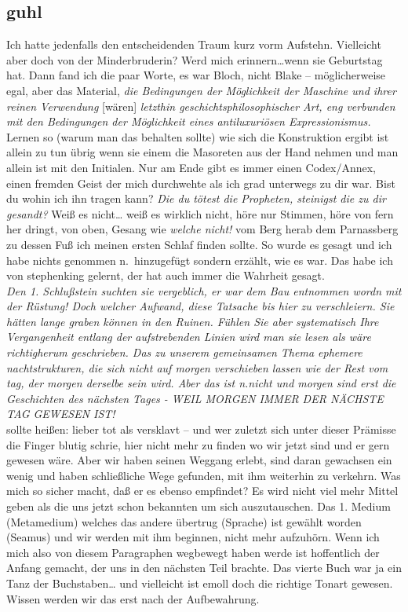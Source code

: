 \documentclass[
]{article}
\author{}
\date{\vspace{-2.5em}}
\begin{document}
\subsection{guhl}\label{guhl}

Ich hatte jedenfalls den entscheidenden Traum kurz vorm Aufstehn.
Vielleicht aber doch von der Minderbruderin? Werd mich
erinnern\ldots wenn sie Geburtstag hat. Dann fand ich die paar Worte, es
war Bloch, nicht Blake -- möglicherweise egal, aber das Material,
\emph{die Bedingungen der Möglichkeit der Maschine und ihrer reinen
Verwendung} {[}wären{]} \emph{letzthin geschichtsphilosophischer Art,
eng verbunden mit den Bedingungen der Möglichkeit eines antiluxuriösen
Expressionismus.} Lernen so (warum man das behalten sollte) wie sich die
Konstruktion ergibt ist allein zu tun übrig wenn sie einem die Masoreten
aus der Hand nehmen und man allein ist mit den Initialen. Nur am Ende
gibt es immer einen Codex/Annex, einen fremden Geist der mich durchwehte
als ich grad unterwegs zu dir war. Bist du wohin ich ihn tragen kann?
\emph{Die du tötest die Propheten, steinigst die zu dir gesandt?} Weiß
es nicht\ldots{} weiß es wirklich nicht, höre nur Stimmen, höre von fern
her dringt, von oben, Gesang wie \emph{welche nicht!} vom Berg herab dem
Parnassberg zu dessen Fuß ich meinen ersten Schlaf finden sollte. So
wurde es gesagt und ich habe nichts genommen n.~hinzugefügt sondern
erzählt, wie es war. Das habe ich von stephenking gelernt, der hat auch
immer die Wahrheit gesagt.\\
\emph{Den 1. Schlußstein suchten sie vergeblich, er war dem Bau
entnommen wordn mit der Rüstung! Doch welcher Aufwand, diese Tatsache
bis hier zu verschleiern. Sie hätten lange graben können in den Ruinen.
Fühlen Sie aber systematisch Ihre Vergangenheit entlang der
aufstrebenden Linien wird man sie lesen als wäre richtigherum
geschrieben. Das zu unserem gemeinsamen Thema ephemere nachtstrukturen,
die sich nicht auf morgen verschieben lassen wie der Rest vom tag, der
morgen derselbe sein wird. Aber das ist n.nicht und morgen sind erst die
Geschichten des nächsten Tages - WEIL MORGEN IMMER DER NÄCHSTE TAG
GEWESEN IST!}\\
sollte heißen: lieber tot als versklavt -- und wer zuletzt sich unter
dieser Prämisse die Finger blutig schrie, hier nicht mehr zu finden wo
wir jetzt sind und er gern gewesen wäre. Aber wir haben seinen Weggang
erlebt, sind daran gewachsen ein wenig und haben schließliche Wege
gefunden, mit ihm weiterhin zu verkehrn. Was mich so sicher macht, daß
er es ebenso empfindet? Es wird nicht viel mehr Mittel geben als die uns
jetzt schon bekannten um sich auszutauschen. Das 1. Medium (Metamedium)
welches das andere übertrug (Sprache) ist gewählt worden (Seamus) und
wir werden mit ihm beginnen, nicht mehr aufzuhörn. Wenn ich mich also
von diesem Paragraphen wegbewegt haben werde ist hoffentlich der Anfang
gemacht, der uns in den nächsten Teil brachte. Das vierte Buch war ja
ein Tanz der Buchstaben\ldots{} und vielleicht ist emoll doch die
richtige Tonart gewesen. Wissen werden wir das erst nach der
Aufbewahrung.
\end{document}
